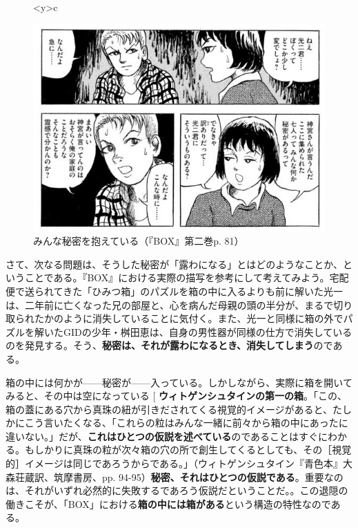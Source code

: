 \documentclass[9pt,b5j,twoside,twocolumn]{utarticle}
\makeatletter
\def\yakuchu{%
\@ifnextchar[\@xfootnote %
{\stepcounter{yakuchu}%
\protected@xdef\@thefnmark{\theyakuchu}%
\@footnotemark\@footnotetext}}
\makeatother
\begin{document}
\begin{figure}[h]
\begin{tabular}<y>{c}
\begin{minipage}[c]{0.71\hsize}
\centering
\includegraphics[scale=0.45]{秘密}
\caption{みんな秘密を抱えている（『BOX』第二巻p. 81）}
\end{minipage}
\end{tabular}
\end{figure}

さて、次なる問題は、そうした秘密が「露わになる」とはどのようなことか、ということである。『BOX』における実際の描写を参考にして考えてみよう。宅配便で送られてきた「ひみつ箱」のパズルを箱の中に入るよりも前に解いた光一は、二年前に亡くなった兄の部屋と、心を病んだ母親の頭の半分が、まるで切り取られたかのように消失していることに気付く。また、光一と同様に箱の外でパズルを解いたGIDの少年・桝田恵は、自身の男性器が同様の仕方で消失しているのを発見する。そう、\textbf{秘密は、それが露わになるとき、消失してしまう}のである。

箱の中には何かが------秘密が------入っている。しかしながら、実際に箱を開いてみると、その中は空になっている\yakuchu{\textbf{ウィトゲンシュタインの第一の箱}。「この、箱の蓋にある穴から真珠の紐が引きだされてくる視覚的イメージがあると、たしかにこう言いたくなる、「これらの粒はみんな一緒に前々から箱の中にあったに違いない。」だが、\textbf{これはひとつの仮説を述べている}のであることはすぐにわかる。もしかりに真珠の粒が次々箱の穴の所で創生してくるとしても、その［視覚的］イメージは同じであろうからである。」（ウィトゲンシュタイン『青色本』大森荘蔵訳、筑摩書房、pp. 94-95）\textbf{秘密、それはひとつの仮説である}。重要なのは、それがいずれ必然的に失敗するであろう仮説だということだ。}。この退隠の働きこそが、「BOX」における\textbf{箱の中には箱がある}という構造の特性なのである。
\end{document}
